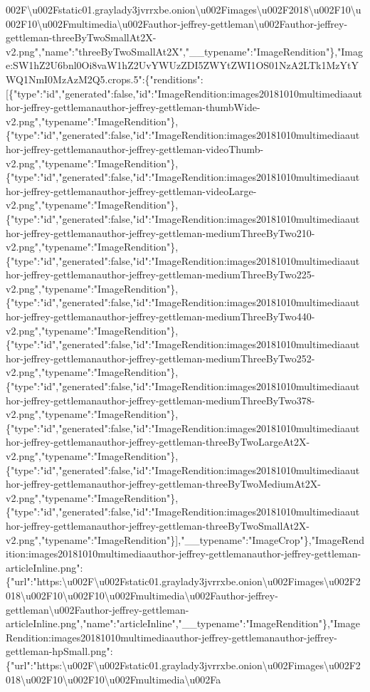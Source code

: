 002F\textbackslash{}u002Fstatic01.graylady3jvrrxbe.onion\textbackslash{}u002Fimages\textbackslash{}u002F2018\textbackslash{}u002F10\textbackslash{}u002F10\textbackslash{}u002Fmultimedia\textbackslash{}u002Fauthor-jeffrey-gettleman\textbackslash{}u002Fauthor-jeffrey-gettleman-threeByTwoSmallAt2X-v2.png","name":"threeByTwoSmallAt2X","\_\_typename":"ImageRendition"\},"Image:SW1hZ2U6bnl0Oi8vaW1hZ2UvYWUzZDI5ZWYtZWI1OS01NzA2LTk1MzYtYWQ1NmI0MzAzM2Q5.crops.5":\{"renditions":{[}\{"type":"id","generated":false,"id":"ImageRendition:images20181010multimediaauthor-jeffrey-gettlemanauthor-jeffrey-gettleman-thumbWide-v2.png","typename":"ImageRendition"\},\{"type":"id","generated":false,"id":"ImageRendition:images20181010multimediaauthor-jeffrey-gettlemanauthor-jeffrey-gettleman-videoThumb-v2.png","typename":"ImageRendition"\},\{"type":"id","generated":false,"id":"ImageRendition:images20181010multimediaauthor-jeffrey-gettlemanauthor-jeffrey-gettleman-videoLarge-v2.png","typename":"ImageRendition"\},\{"type":"id","generated":false,"id":"ImageRendition:images20181010multimediaauthor-jeffrey-gettlemanauthor-jeffrey-gettleman-mediumThreeByTwo210-v2.png","typename":"ImageRendition"\},\{"type":"id","generated":false,"id":"ImageRendition:images20181010multimediaauthor-jeffrey-gettlemanauthor-jeffrey-gettleman-mediumThreeByTwo225-v2.png","typename":"ImageRendition"\},\{"type":"id","generated":false,"id":"ImageRendition:images20181010multimediaauthor-jeffrey-gettlemanauthor-jeffrey-gettleman-mediumThreeByTwo440-v2.png","typename":"ImageRendition"\},\{"type":"id","generated":false,"id":"ImageRendition:images20181010multimediaauthor-jeffrey-gettlemanauthor-jeffrey-gettleman-mediumThreeByTwo252-v2.png","typename":"ImageRendition"\},\{"type":"id","generated":false,"id":"ImageRendition:images20181010multimediaauthor-jeffrey-gettlemanauthor-jeffrey-gettleman-mediumThreeByTwo378-v2.png","typename":"ImageRendition"\},\{"type":"id","generated":false,"id":"ImageRendition:images20181010multimediaauthor-jeffrey-gettlemanauthor-jeffrey-gettleman-threeByTwoLargeAt2X-v2.png","typename":"ImageRendition"\},\{"type":"id","generated":false,"id":"ImageRendition:images20181010multimediaauthor-jeffrey-gettlemanauthor-jeffrey-gettleman-threeByTwoMediumAt2X-v2.png","typename":"ImageRendition"\},\{"type":"id","generated":false,"id":"ImageRendition:images20181010multimediaauthor-jeffrey-gettlemanauthor-jeffrey-gettleman-threeByTwoSmallAt2X-v2.png","typename":"ImageRendition"\}{]},"\_\_typename":"ImageCrop"\},"ImageRendition:images20181010multimediaauthor-jeffrey-gettlemanauthor-jeffrey-gettleman-articleInline.png":\{"url":"https:\textbackslash{}u002F\textbackslash{}u002Fstatic01.graylady3jvrrxbe.onion\textbackslash{}u002Fimages\textbackslash{}u002F2018\textbackslash{}u002F10\textbackslash{}u002F10\textbackslash{}u002Fmultimedia\textbackslash{}u002Fauthor-jeffrey-gettleman\textbackslash{}u002Fauthor-jeffrey-gettleman-articleInline.png","name":"articleInline","\_\_typename":"ImageRendition"\},"ImageRendition:images20181010multimediaauthor-jeffrey-gettlemanauthor-jeffrey-gettleman-hpSmall.png":\{"url":"https:\textbackslash{}u002F\textbackslash{}u002Fstatic01.graylady3jvrrxbe.onion\textbackslash{}u002Fimages\textbackslash{}u002F2018\textbackslash{}u002F10\textbackslash{}u002F10\textbackslash{}u002Fmultimedia\textbackslash{}u002Fa